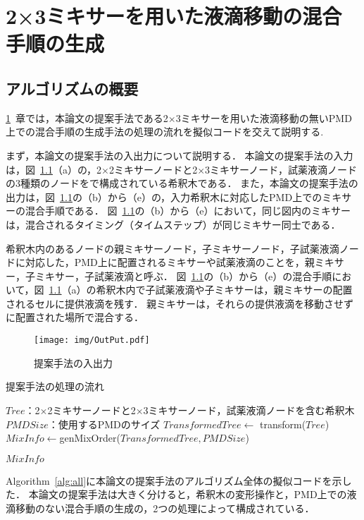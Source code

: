 \chapter{{2×3ミキサーを用いた液滴移動の混合手順の生成}}
\label{proposed}
\section{アルゴリズムの概要}
\ref{proposed}~章では，本論文の提案手法である2$\times$3ミキサーを用いた液滴移動の無いPMD上での混合手順の生成手法の処理の流れを擬似コードを交えて説明する.


まず，本論文の提案手法の入出力について説明する．
本論文の提案手法の入力は，図~\ref{fig:inputoutput}（a）の，2$\times$2ミキサーノードと2$\times$3ミキサーノード，試薬液滴ノードの3種類のノードをで構成されている希釈木である．
また，本論文の提案手法の出力は，図~\ref{fig:inputoutput}の（b）から（e）の，入力希釈木に対応したPMD上でのミキサーの混合手順である．
図~\ref{fig:inputoutput}の（b）から（e）において，同じ図内のミキサーは，混合されるタイミング（タイムステップ）が同じミキサー同士である．

希釈木内のあるノードの親ミキサーノード，子ミキサーノード，子試薬液滴ノードに対応した，PMD上に配置されるミキサーや試薬液滴のことを，親ミキサー，子ミキサー，子試薬液滴と呼ぶ．
図~\ref{fig:inputoutput}の（b）から（e）の混合手順において，図~\ref{fig:inputoutput}（a）の希釈木内で子試薬液滴や子ミキサーは，親ミキサーの配置されるセルに提供液滴を残す．
親ミキサーは，それらの提供液滴を移動させずに配置された場所で混合する．

\begin{figure}[tbp]
 \centering\texttt{[image: img/OutPut.pdf]}
 \caption{提案手法の入出力}\label{fig:inputoutput}
\end{figure}

\begin{algorithm}[tbp]
 \caption{提案手法の処理の流れ}\label{alg:all}
 \begin{algorithmic}[1]
     \Require $\mathit{Tree}$：2$\times$2ミキサーノードと2$\times$3ミキサーノード，試薬液滴ノードを含む希釈木 
     \Require $\mathit{PMDSize}$：使用するPMDのサイズ
     \State $\mathit{TransformedTree} \gets$ transform($Tree$) \label{transform_pseudo}
     \State $\mathit{MixInfo \gets}$genMixOrder($\mathit{TransformedTree,PMDSize}$)  \label{xntm_pseudo}

      \Return $\mathit{MixInfo}$
 \end{algorithmic}
\end{algorithm}
Algorithm~\ref{alg:all}に本論文の提案手法のアルゴリズム全体の擬似コードを示した．
本論文の提案手法は大きく分けると，希釈木の変形操作と，PMD上での液滴移動のない混合手順の生成の，2つの処理によって構成されている．

